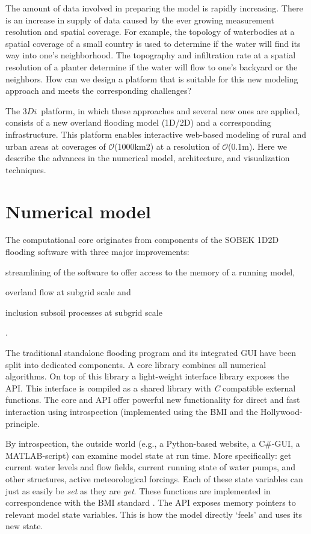 \documentclass[a4paper]{article}
\DeclareRobustCommand{\orderof}{\ensuremath{\mathcal{O}}}
\DeclareRobustCommand{\threedi}{$3Di$~}
\begin{document}
The amount of data involved in preparing the model is rapidly increasing. There is an increase in supply of data caused by the ever growing measurement resolution and spatial coverage. For example, the topology of waterbodies at a spatial coverage of a small country is used to determine if the water will find its way into one's neighborhood. The topography and infiltration rate at a spatial resolution of a planter determine if the water will flow to one's backyard or the neighbors. How can we design a platform that is suitable for this new modeling approach and meets the corresponding challenges?

The \threedi  platform, in which these approaches and several new ones are applied, consists of a new overland flooding model (1D/2D) and a corresponding infrastructure. This platform enables interactive web-based modeling of rural and urban areas at coverages of \orderof(1000km2) at a resolution of \orderof(0.1m). Here we describe the advances in the numerical model, architecture, and visualization techniques.

\section{Numerical model}
The computational core originates from components of the {SOBEK} 1D2D flooding software \citep{Stelling2006} with three major improvements: \begin{inparaenum}
\item streamlining of the software to offer access to the memory of a running model,
\item overland flow at subgrid scale and
\item inclusion subsoil processes at subgrid scale
\end{inparaenum}.

The traditional standalone flooding program and its integrated \ac{GUI} have been split into dedicated components. A core library combines all numerical algorithms. On top of this library a light-weight interface library exposes the \ac{API}. This interface is compiled as a shared library with \emph{C} compatible external functions. The core and \ac{API} offer powerful new functionality for direct and fast interaction using introspection (implemented using the \ac{BMI} and the Hollywood-principle.

By introspection, the outside world (e.g., a Python-based website, a C\#-\ac{GUI}, a MATLAB-script) can examine model state at run time. More specifically: get current water levels and flow fields, current running state of water pumps, and other structures, active meteorological forcings.
Each of these state variables can just as easily be \emph{set} as they are \emph{get}. These functions are implemented in correspondence with the \ac{BMI} standard \citep{Peckham2013}. The \ac{API} exposes memory pointers to relevant model state variables. This is how the model directly `feels' and uses its new state.
\end{document}
